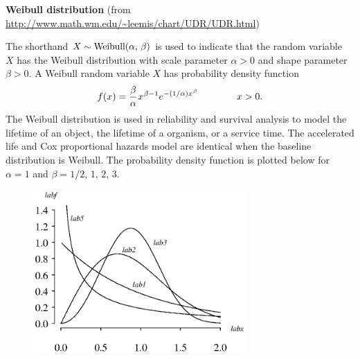 \documentclass[12pt,fullpage]{article}
\begin{document}
\noindent
{\bf Weibull distribution} (from \color{blue}\url{http://www.math.wm.edu/~leemis/chart/UDR/UDR.html}\color{black})

\noindent
The shorthand $X \sim \hbox{Weibull}(\alpha, \, \beta)$ is used to indicate that the
random variable~$X$ has the Weibull distribution with scale parameter $\alpha > 0$ and shape parameter $\beta > 0$.
A Weibull random variable $X$ has probability density function 
$$
f(x) = \frac{\beta}{\alpha} \kern 0.04em x ^ {\kern 0.04em \beta - 1} e ^ {- (1/ \alpha) x ^ {\kern 0.04em \beta}} \qquad \qquad x > 0.
$$
The Weibull distribution is used in reliability and survival analysis to model the lifetime of an object, the lifetime of a organism, or a service time.
The accelerated life and Cox proportional hazards model are identical when the baseline distribution is Weibull.
The probability density function is plotted below for $\alpha = 1$ and $\beta = 1/2, \, 1, \, 2, \, 3$.

\begin{figure}[h!]
\begin{center}
\includegraphics[width=3.2in]{WeibullPlot.ps}
\end{center}
\end{figure}
\end{document}
